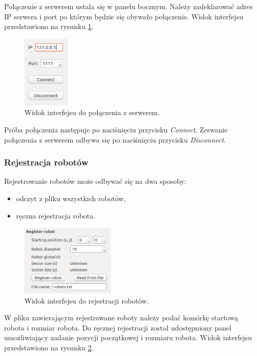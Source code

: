		Połączenie z serwerem ustala się w panelu bocznym. Należy zadeklarować adres IP serwera i port po którym będzie się obywało połączenie. Widok interfejsu przedstawiono na rysunku \ref{fig:polaczenie}.
		
		\begin{figure}[!htp]
  			\centering
		  	\includegraphics[width=0.2\textwidth]{img/polaczenie.png}
  			\caption{Widok interfejsu do połączenia z serwerem.}
  			\label{fig:polaczenie}
		\end{figure}
		
		Próba połączenia następuje po naciśnięciu przycisku \textit{Connect}. Zerwanie połączenia z serwerem odbywa się po naciśnięciu przycisku \textit{Disconnect}.
	
	\subsubsection{Rejestracja robotów}
	
	Rejestrowanie robotów może odbywać się na dwa sposoby:
	\begin{itemize}
		\item odczyt z pliku wszystkich robotów,
		\item ręczna rejestracja robota.
	\end{itemize}
	
		\begin{figure}[!htp]
  			\centering
		  	\includegraphics[width=0.4\textwidth]{img/rejestracja.png}
  			\caption{Widok interfejsu do rejestracji robotów.}
  			\label{fig:rejestracja}
		\end{figure}
	
	
	W pliku zawierającym rejestrowane roboty należy podać komórkę startową robota i rozmiar robota.
	Do ręcznej rejestracji został udostępniony panel umożliwiający zadanie pozycji początkowej i rozmiaru robota. Widok interfejsu przedstawiono na rysunku \ref{fig:rejestracja}.
	

